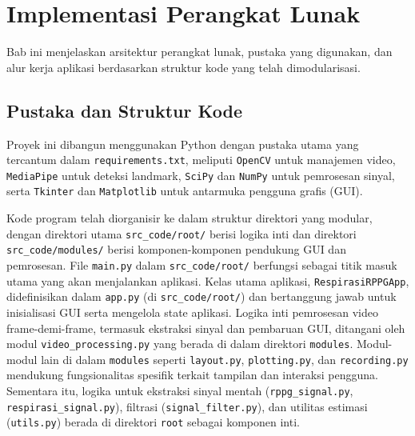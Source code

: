 \documentclass[11pt,a4paper]{article}
\begin{document}
\section{Implementasi Perangkat Lunak}
Bab ini menjelaskan arsitektur perangkat lunak, pustaka yang digunakan, dan alur kerja aplikasi berdasarkan struktur kode yang telah dimodularisasi.

\subsection{Pustaka dan Struktur Kode}
Proyek ini dibangun menggunakan Python dengan pustaka utama yang tercantum dalam \texttt{requirements.txt}, meliputi \texttt{OpenCV} untuk manajemen video, \texttt{MediaPipe} untuk deteksi landmark, \texttt{SciPy} dan \texttt{NumPy} untuk pemrosesan sinyal, serta \texttt{Tkinter} dan \texttt{Matplotlib} untuk antarmuka pengguna grafis (GUI).

Kode program telah diorganisir ke dalam struktur direktori yang modular, dengan direktori utama \texttt{src\_code/root/} berisi logika inti dan direktori \texttt{src\_code/modules/} berisi komponen-komponen pendukung GUI dan pemrosesan. File \texttt{main.py} dalam \texttt{src\_code/root/} berfungsi sebagai titik masuk utama yang akan menjalankan aplikasi. Kelas utama aplikasi, \texttt{RespirasiRPPGApp}, didefinisikan dalam \texttt{app.py} (di \texttt{src\_code/root/}) dan bertanggung jawab untuk inisialisasi GUI serta mengelola state aplikasi. Logika inti pemrosesan video frame-demi-frame, termasuk ekstraksi sinyal dan pembaruan GUI, ditangani oleh modul \texttt{video\_processing.py} yang berada di dalam direktori \texttt{modules}. Modul-modul lain di dalam \texttt{modules} seperti \texttt{layout.py}, \texttt{plotting.py}, dan \texttt{recording.py} mendukung fungsionalitas spesifik terkait tampilan dan interaksi pengguna. Sementara itu, logika untuk ekstraksi sinyal mentah (\texttt{rppg\_signal.py}, \texttt{respirasi\_signal.py}), filtrasi (\texttt{signal\_filter.py}), dan utilitas estimasi (\texttt{utils.py}) berada di direktori \texttt{root} sebagai komponen inti.
\end{document}

